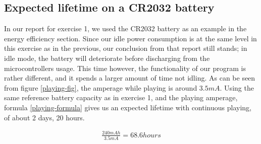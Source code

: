 \subsection{Expected lifetime on a CR2032 battery}

In our report for exercise 1, we used the CR2032 battery as an example in the energy efficiency section. \cite[p.~13]{exercise1report} Since our idle power consumption is at the same level in this exercise as in the previous, our conclusion from that report still stands; in idle mode, the battery will deteriorate before discharging from the microcontrollers usage. This time however, the functionality of our program is rather different, and it spends a larger amount of time not idling. As can be seen from figure \ref{playing-fig}, the amperage while playing is around $3.5mA$. Using the same reference battery capacity \cite{cr2032} as in exercise 1, and the playing amperage, formula \ref{playing-formula} gives us an expected lifetime with continuous playing, of about 2 days, 20 hours.

\begin{gather*}
\label{playing-formula}
\frac{240mAh}{3.5mA} = 68.6 hours
\end{gather*}
